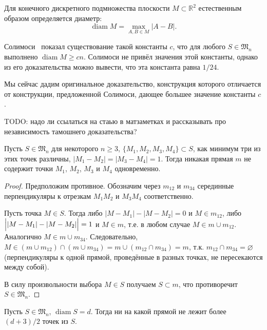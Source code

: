 Для конечного дискретного подмножества плоскости $M\subset \mathbb{R}^2$
естественным образом определяется диаметр:
\begin{equation*}
	\operatorname{diam} M = \max_{A,B\in M} |A-B|
	.
\end{equation*}

Солимоси~\cite{solymosi2003note} показал существование такой константы $c$,
что для любого $S\in\mathfrak{M}_n$ выполнено $\operatorname{diam} M \geq c n$.
Солимоси не привёл значения этой константы, однако из его доказательства можно вывести,
что эта константа равна $1/24$.

Мы сейчас дадим оригинальное доказательство, конструкция которого отличается от конструкции,
предложенной Солимоси, дающее большее значение константы $c$.

TODO: надо ли ссылаться на стаью в матзаметках и рассказывать про независимость тамошнего доказательства?

\begin{lemma}
	\label{lemma_points_on_line}
	Пусть $S\in\mathfrak{M}_n$ для некоторого $n \geqslant 3$,
	$\{M_1, M_2, M_3, M_4\} \subset S$, как минимум три из этих точек различны,
	$|M_1 - M_2| = |M_3 - M_4| = 1$.
	Тогда никакая прямая $m$ не содержит точки $M_1$, $M_2$, $M_3$ и $M_4$ одновременно.
\end{lemma}

\begin{proof}
	Предположим противное.
	Обозначим через $m_{12}$ и $m_{34}$ серединные перпендикуляры к отрезкам $M_1 M_2$ и $M_3 M_4$ соответственно.

	Пусть точка $M\in S$.
	Тогда либо $|M - M_1| - |M - M_2| = 0$ и $M\in m_{12}$, либо $\Bigl||M - M_1| - |M - M_2|\Bigr| = 1$ и $M\in m$,
	т.е. в любом случае $M\in m \cup m_{12}$.
	Аналогично $M\in m \cup m_{34}$.
	Следовательно, $M\in (m \cup m_{12}) \cap (m \cup m_{34}) = m \cup (m_{12} \cap m_{34}) = m$,
	т.к. $m_{12} \cap m_{34} = \varnothing$ (перпендикуляры к одной прямой, проведённые в разных точках, не пересекаются между собой).

	В силу произвольности выбора $M \in S$ получаем $S \subset m$, что противоречит $S\in\mathfrak{M}_n$.
\end{proof}

\begin{corollary}
	\label{corollary:max_points_on_line}
	Пусть $S\in\mathfrak{M}_n$, $\operatorname{diam} S = d$.
	Тогда ни на какой прямой не лежит более $(d+3)/2$ точек из $S$.
\end{corollary}

